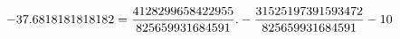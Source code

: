 \documentclass[preview]{standalone}
\begin{document}
\begin{align*}
\special{dvisvgm:raw <g id='unique000'>}-37.6818181818182 = \frac{4128299658422955}{825659931684591}.- \frac{31525197391593472}{825659931684591} - 10\special{dvisvgm:raw </g>}
\end{align*}
\end{document}
